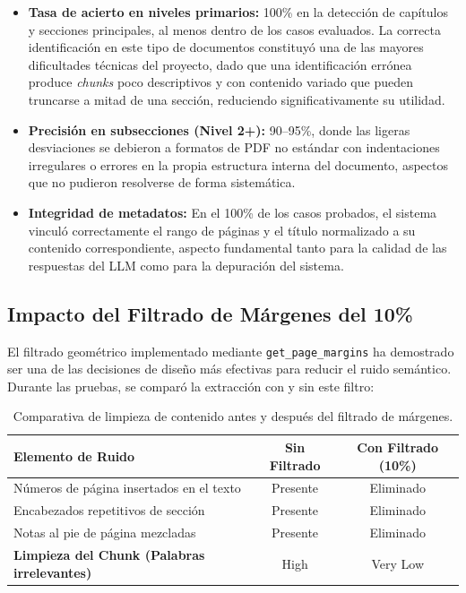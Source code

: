 \begin{itemize}
    \item \textbf{Tasa de acierto en niveles primarios:} 100\% en la detección de capítulos y secciones principales, al menos dentro de los casos evaluados. La correcta identificación en este tipo de documentos constituyó una de las mayores dificultades técnicas del proyecto, dado que una identificación errónea produce \textit{chunks} poco descriptivos y con contenido variado que pueden truncarse a mitad de una sección, reduciendo significativamente su utilidad.
    \item \textbf{Precisión en subsecciones (Nivel 2+):} 90--95\%, donde las ligeras desviaciones se debieron a formatos de PDF no estándar con indentaciones irregulares o errores en la propia estructura interna del documento, aspectos que no pudieron resolverse de forma sistemática.
    \item \textbf{Integridad de metadatos:} En el 100\% de los casos probados, el sistema vinculó correctamente el rango de páginas y el título normalizado a su contenido correspondiente, aspecto fundamental tanto para la calidad de las respuestas del LLM como para la depuración del sistema.
\end{itemize}

\subsection{Impacto del Filtrado de Márgenes del 10\%}
El filtrado geométrico implementado mediante \texttt{get\_page\_margins} ha demostrado ser una de las decisiones de diseño más efectivas para reducir el ruido semántico. Durante las pruebas, se comparó la extracción con y sin este filtro:

\begin{table}[ht]
\centering
\begin{tabular}{|l|c|c|}
\hline
\textbf{Elemento de Ruido} & \textbf{Sin Filtrado} & \textbf{Con Filtrado (10\%)} \\ \hline
Números de página insertados en el texto & Presente & Eliminado \\ \hline
Encabezados repetitivos de sección & Presente & Eliminado \\ \hline
Notas al pie de página mezcladas & Presente & Eliminado \\ \hline
\textbf{Limpieza del Chunk (Palabras irrelevantes)} & High & Very Low \\ \hline
\end{tabular}
\caption{Comparativa de limpieza de contenido antes y después del filtrado de márgenes.}
\label{tab:comparativa_margenes}
\end{table}

